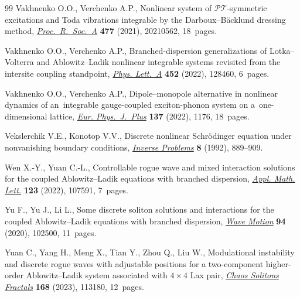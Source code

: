 \documentclass[10pt,a4paper]{amsart}
\providecommand{\LastPageEnding}{}
\numberwithin{equation}{section}
\begin{document}
\begin{thebibliography}{99}
Vakhnenko O.O., Verchenko A.P., Nonlinear system of {$\mathcal{PT}$}-symmetric
 excitations and {T}oda vibrations integrable by the {D}arboux--{B}\"acklund
 dressing method,
 \href{https://doi.org/10.1098/rspa.2021.0562}{\textit{Proc.~R.~Soc.~A}} \textbf{477}
 (2021), 20210562, 18~pages.

Vakhnenko O.O., Verchenko A.P., Branched-dispersion generalizations of
 {L}otka--{V}olterra and {A}blowitz--{L}adik nonlinear integrable systems
 revisited from the intersite coupling standpoint,
 \href{https://doi.org/10.1016/j.physleta.2022.128460}{\textit{Phys. Lett.~A}}
 \textbf{452} (2022), 128460, 6~pages.

Vakhnenko O.O., Verchenko A.P., Dipole--monopole alternative in nonlinear
 dynamics of an~integrable gauge-coupled exciton-phonon system on
 a~one-dimensional lattice,
 \href{https://doi.org/10.1140/epjp/s13360-022-03335-w}{\textit{Eur.
 Phys.~J.~Plus}} \textbf{137} (2022), 1176, 18~pages.

Vekslerchik V.E., Konotop V.V., Discrete nonlinear {S}chr\"odinger equation
 under nonvanishing boundary conditions,
 \href{https://doi.org/10.1088/0266-5611/8/6/007}{\textit{Inverse Problems}}
 \textbf{8} (1992), 889--909.

Wen X.-Y., Yuan C.-L., Controllable rogue wave and mixed interaction solutions
 for the coupled {A}blowitz--{L}adik equations with branched dispersion,
 \href{https://doi.org/10.1016/j.aml.2021.107591}{\textit{Appl. Math. Lett.}}
 \textbf{123} (2022), 107591, 7~pages.

Yu F., Yu J., Li L., Some discrete soliton solutions and interactions for the
 coupled {A}blowitz--{L}adik equations with branched dispersion,
 \href{https://doi.org/10.1016/j.wavemoti.2019.102500}{\textit{Wave Motion}}
 \textbf{94} (2020), 102500, 11~pages.

Yuan C., Yang H., Meng X., Tian Y., Zhou Q., Liu W., Modulational instability
 and discrete rogue waves with adjustable positions for a two-component
 higher-order {A}blowitz--{L}adik system associated with {$4\times 4$} {L}ax
 pair, \href{https://doi.org/10.1016/j.chaos.2023.113180}{\textit{Chaos
 Solitons Fractals}} \textbf{168} (2023), 113180, 12~pages.

\end{thebibliography}\LastPageEnding
\end{document}
